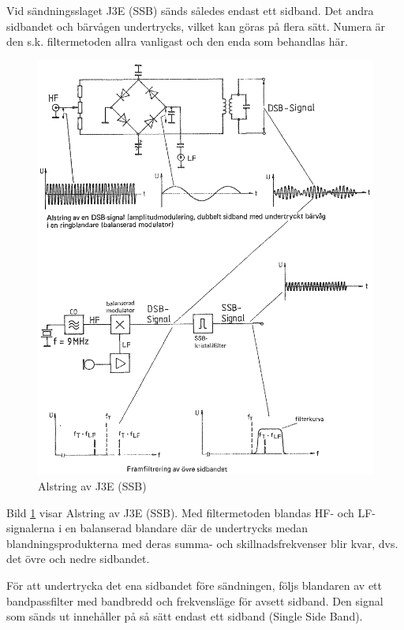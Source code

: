 Vid sändningsslaget J3E (SSB) sänds således endast ett sidband.
Det andra sidbandet och bärvågen undertrycks, vilket kan göras på flera sätt.
Numera är den s.k. filtermetoden allra vanligast och den enda som behandlas här.

\begin{figure}
\includegraphics[width=\textwidth]{images/cropped_pdfs/bild_2_3-90.pdf}
\caption{Alstring av J3E (SSB)}
\label{fig:BildII3-90}
\end{figure}

Bild \ref{fig:BildII3-90} visar Alstring av J3E (SSB).
Med filtermetoden blandas HF- och LF-signalerna i en balanserad blandare där de
undertrycks medan blandningsprodukterna med deras summa- och
skillnadsfrekvenser blir kvar, dvs. det övre och nedre sidbandet.

För att undertrycka det ena sidbandet före sändningen, följs blandaren
av ett bandpassfilter med bandbredd och frekvensläge för avsett sidband.
Den signal som sänds ut innehåller på så sätt endast ett sidband (Single Side
Band).

